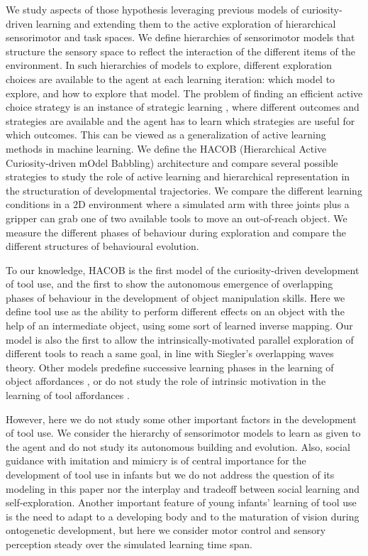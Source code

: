 \documentclass[10pt,letterpaper]{article}
\begin{document}
	We study aspects of those hypothesis leveraging previous models of curiosity-driven learning and extending them to the active exploration of hierarchical sensorimotor and task spaces.
	We define hierarchies of sensorimotor models that structure the sensory space to reflect the interaction of the different items of the environment.
	In such hierarchies of models to explore, different exploration choices are available to the agent at each learning iteration: which model to explore, and how to explore that model.
	The problem of finding an efficient active choice strategy is an instance of strategic learning \cite{nguyen2012}, 
	where different outcomes and strategies are available and the agent has to learn which strategies are useful for which outcomes. 
	This can be viewed as a generalization of active learning methods in machine learning.
	We define the HACOB (Hierarchical Active Curiosity-driven mOdel Babbling) architecture and compare several possible strategies 
	to study the role of active learning and hierarchical representation in the structuration of developmental trajectories.
	We compare the different learning conditions in a $2$D environment where a simulated arm with three joints plus a gripper can grab one of two available tools to move an out-of-reach object.
	We measure the different phases of behaviour during exploration and compare the different structures of behavioural evolution.
	
	To our knowledge, HACOB is the first model of the curiosity-driven development of tool use, 
	and the first to show the autonomous emergence of overlapping phases of behaviour in the development of object manipulation skills.
	Here we define  tool use as the ability to perform different effects on an object with the help of an intermediate object, using some sort of learned inverse mapping.
	Our model is also the first to allow the intrinsically-motivated parallel exploration of different tools to reach a same goal, in line with Siegler's overlapping waves theory.
	Other models predefine successive learning phases in the learning of object affordances \cite{ugur2015}, or do not study the role of intrinsic motivation in the learning of tool affordances \cite{stoytchev2005behavior}.
	
	However, here we do not study some other important factors in the development of tool use.
	We consider the hierarchy of sensorimotor models to learn as given to the agent and do not study its autonomous building and evolution.
	Also, social guidance with imitation and mimicry is of central importance for the development of tool use in infants but we do not address the question
	of its modeling in this paper nor the interplay and tradeoff between social learning and self-exploration.
	Another important feature of young infants' learning of tool use is the need to adapt to a developing body and to the maturation of vision during ontogenetic development, 
	but here we consider motor control and sensory perception steady over the simulated learning time span.
\end{document}

